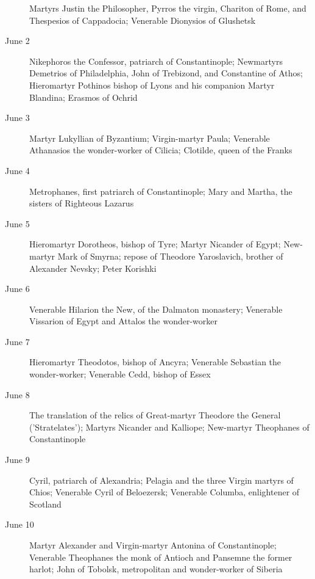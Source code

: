 \begin{description}
Martyrs Justin the Philosopher, Pyrros the virgin, Chariton of Rome, and Thespesios of Cappadocia; Venerable Dionysios of Glushetsk

\item[June 2]

Nikephoros the Confessor, patriarch of Constantinople; Newmartyrs Demetrios of Philadelphia, John of Trebizond, and Constantine of Athos; Hieromartyr Pothinos bishop of Lyons and his companion Martyr Blandina; Erasmos of Ochrid

\item[June 3]

Martyr Lukyllian of Byzantium; Virgin-martyr Paula; Venerable Athanasios the wonder-worker of Cilicia; Clotilde, queen of the Franks

\item[June 4]

Metrophanes, first patriarch of Constantinople; Mary and Martha, the sisters of Righteous Lazarus

\item[June 5]

Hieromartyr Dorotheos, bishop of Tyre; Martyr Nicander of Egypt; New-martyr Mark of Smyrna; repose of Theodore Yaroslavich, brother of Alexander Nevsky; Peter Korishki

\item[June 6]

Venerable Hilarion the New, of the Dalmaton monastery; Venerable Vissarion of Egypt and Attalos the wonder-worker

\item[June 7]

Hieromartyr Theodotos, bishop of Ancyra; Venerable Sebastian the wonder-worker; Venerable Cedd, bishop of Essex

\item[June 8]

The translation of the relics of Great-martyr Theodore the General ('Stratelates'); Martyrs Nicander and Kalliope; New-martyr Theophanes of Constantinople

\item[June 9]

Cyril, patriarch of Alexandria; Pelagia and the three Virgin martyrs of Chios; Venerable Cyril of Beloezersk; Venerable Columba, enlightener of Scotland

\item[June 10]

Martyr Alexander and Virgin-martyr Antonina of Constantinople; Venerable Theophanes the monk of Antioch and Pansemne the former harlot; John of Tobolsk, metropolitan and wonder-worker of Siberia


\end{description}
